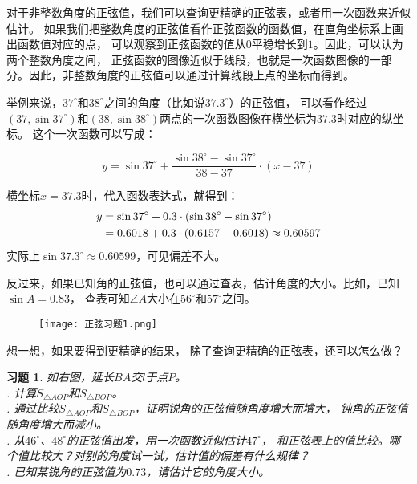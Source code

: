 \documentclass[12pt,UTF8]{ctexbook}
\newtheorem{xt}{习题}[section]
\begin{document}
对于非整数角度的正弦值，我们可以查询更精确的正弦表，或者用一次函数来近似估计。
如果我们把整数角度的正弦值看作正弦函数的函数值，在直角坐标系上画出函数值对应的点，
可以观察到正弦函数的值从$0$平稳增长到$1$。因此，可以认为两个整数角度之间，
正弦函数的图像近似于线段，也就是一次函数图像的一部分。因此，非整数角度的正弦值可以通过计算线段上点的坐标而得到。

举例来说，$37^\circ$和$38^\circ$之间的角度（比如说$37.3^\circ$）的正弦值，
可以看作经过$(37, \sin 37^\circ)$和$(38, \sin 38^\circ)$两点的一次函数图像在横坐标为$37.3$时对应的纵坐标。
这个一次函数可以写成：

$$ y = \sin 37^\circ + \frac{\sin 38^\circ - \sin 37^\circ}{38 - 37} \cdot (x - 37)$$

横坐标$x=37.3$时，代入函数表达式，就得到：
\begin{align}
    y &= \sin 37^\circ + 0.3\cdot(\sin 38^\circ - \sin 37^\circ ) \notag \\
    &= 0.6018 + 0.3 \cdot (0.6157 - 0.6018) \approx 0.60597 \notag
\end{align}
实际上$\sin 37.3^\circ \approx 0.60599$，可见偏差不大。

反过来，如果已知角的正弦值，也可以通过查表，估计角度的大小。比如，已知$\sin A = 0.83$，
查表可知$\angle A$大小在$56^\circ$和$57^\circ$之间。

\begin{wrapfigure}[5]{r}{0.42\textwidth} %
    \vspace{-25pt}
    \flushright
    \texttt{[image: 正弦习题1.png]}
\end{wrapfigure}

想一想，如果要得到更精确的结果，
除了查询更精确的正弦表，还可以怎么做？

\begin{xt}
    如右图，延长$BA$交$l$于点$P$。\\
    . 计算$S_{\triangle AOP}$和$S_{\triangle BOP}$。 \\
    . 通过比较$S_{\triangle AOP}$和$S_{\triangle BOP}$，证明锐角的正弦值随角度增大而增大，
    钝角的正弦值随角度增大而减小。 \\
    . 从$46^\circ$、$48^\circ$的正弦值出发，用一次函数近似估计$47^\circ$，
    和正弦表上的值比较。哪个值比较大？对别的角度试一试，估计值的偏差有什么规律？ \\
    . 已知某锐角的正弦值为$0.73$，请估计它的角度大小。
\end{xt}
\end{document}
